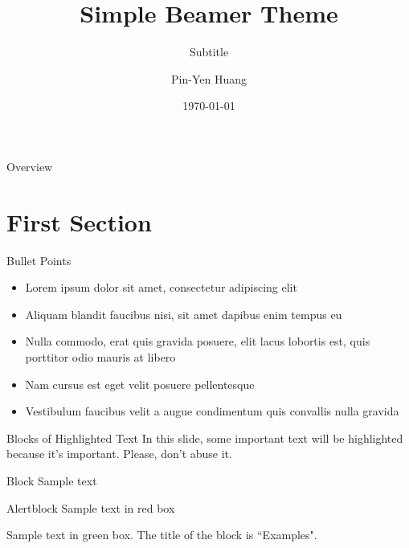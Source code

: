 \documentclass[aspectratio=169,xcolor=dvipsnames]{beamer}
\title[short title]{Simple Beamer Theme}
\subtitle{Subtitle}
\author[Pin-Yen] {Pin-Yen Huang}
\institute[NTU] %
{
    Department of Computer Science and Information Engineering \\
    National Taiwan University 
    \vskip 3pt
}
\date{\today} %
\begin{document}
\begin{frame}
    \titlepage
\end{frame}

\begin{frame}{Overview}
    \tableofcontents
\end{frame}

\section{First Section}

\begin{frame}{Bullet Points}
    \begin{itemize}
        \item Lorem ipsum dolor sit amet, consectetur adipiscing elit
        	\vspace{1em}
        \item Aliquam blandit faucibus nisi, sit amet dapibus enim tempus eu
        	\vspace{1em}
        \item Nulla commodo, erat quis gravida posuere, elit lacus lobortis est, quis porttitor odio mauris at libero
        	\vspace{1em}
        \item Nam cursus est eget velit posuere pellentesque
         	\vspace{1em}
        \item Vestibulum faucibus velit a augue condimentum quis convallis nulla gravida
    \end{itemize}
\end{frame}


\begin{frame}{Blocks of Highlighted Text}
    In this slide, some important text will be \alert{highlighted} because it's important. Please, don't abuse it.

    \begin{block}{Block}
        Sample text
    \end{block}

    \begin{alertblock}{Alertblock}
        Sample text in red box
    \end{alertblock}

    \begin{examples}
        Sample text in green box. The title of the block is ``Examples".
    \end{examples}
\end{frame}
\end{document}
